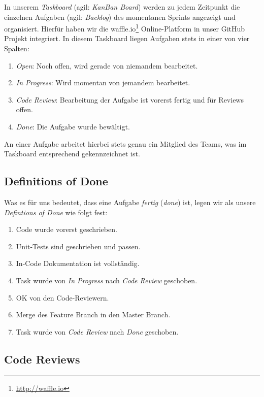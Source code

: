 In unserem \emph{Taskboard} (agil: \emph{KanBan Board}) werden zu jedem
Zeitpunkt die einzelnen Aufgaben (agil: \emph{Backlog}) des momentanen Sprints
angezeigt und organisiert. Hierfür haben wir die
waffle.io\footnote{\url{http://waffle.io}} Online-Platform in unser GitHub
Projekt integriert. In diesem Taskboard liegen Aufgaben stets in einer von vier
Spalten:

\begin{enumerate}
  \item \emph{Open}: Noch offen, wird gerade von niemandem bearbeitet.
  \item \emph{In Progress}: Wird momentan von jemandem bearbeitet.
  \item \emph{Code Review}: Bearbeitung der Aufgabe ist vorerst fertig und für
    Reviews offen.
  \item \emph{Done}: Die Aufgabe wurde bewältigt.
\end{enumerate}

An einer Aufgabe arbeitet hierbei stets genau ein Mitglied des Teams, was im
Taskboard entsprechend gekennzeichnet ist.

\subsection{Definitions of Done}

Was es für uns bedeutet, dass eine Aufgabe \emph{fertig} (\emph{done}) ist,
legen wir als unsere \emph{Defintions of Done} wie folgt fest:

\begin{enumerate}
  \item Code wurde vorerst geschrieben.
  \item Unit-Tests sind geschrieben und passen.
  \item In-Code Dokumentation ist vollständig.
  \item Task wurde von \emph{In Progress} nach \emph{Code Review} geschoben.
  \item OK von den Code-Reviewern.
  \item Merge des Feature Branch in den Master Branch.
  \item Task wurde von \emph{Code Review} nach \emph{Done} geschoben.
\end{enumerate}

\subsection{Code Reviews}

